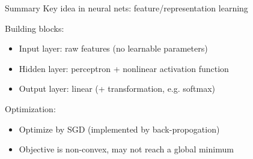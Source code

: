 \documentclass[usenames,dvipsnames,notes,11pt,aspectratio=169]{beamer}
\begin{document}
\begin{frame}
    {Summary}
    Key idea in neural nets: feature/representation learning 

    Building blocks:\\
    \begin{itemize}
        \item Input layer: raw features (no learnable parameters)
        \item Hidden layer: perceptron + nonlinear activation function
        \item Output layer: linear (+ transformation, e.g. softmax)
    \end{itemize}

    Optimization:\\
    \begin{itemize}
        \item Optimize by SGD (implemented by back-propogation)
        \item Objective is non-convex, may not reach a global minimum
    \end{itemize}
\end{frame}
\end{document}
